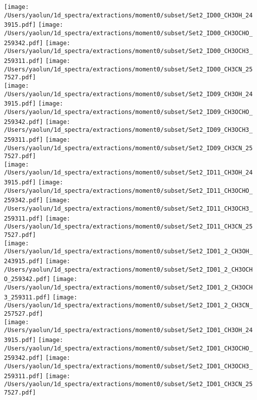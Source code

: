 \addtocounter{figure}{-1}
\begin{figure*}[htbp!]
  \centering
  \texttt{[image: /Users/yaolun/1d\_spectra/extractions/moment0/subset/Set2\_ID00\_CH3OH\_243915.pdf]}
  \texttt{[image: /Users/yaolun/1d\_spectra/extractions/moment0/subset/Set2\_ID00\_CH3OCHO\_259342.pdf]}
  \texttt{[image: /Users/yaolun/1d\_spectra/extractions/moment0/subset/Set2\_ID00\_CH3OCH3\_259311.pdf]}
  \texttt{[image: /Users/yaolun/1d\_spectra/extractions/moment0/subset/Set2\_ID00\_CH3CN\_257527.pdf]}
  \\
  \texttt{[image: /Users/yaolun/1d\_spectra/extractions/moment0/subset/Set2\_ID09\_CH3OH\_243915.pdf]}
  \texttt{[image: /Users/yaolun/1d\_spectra/extractions/moment0/subset/Set2\_ID09\_CH3OCHO\_259342.pdf]}
  \texttt{[image: /Users/yaolun/1d\_spectra/extractions/moment0/subset/Set2\_ID09\_CH3OCH3\_259311.pdf]}
  \texttt{[image: /Users/yaolun/1d\_spectra/extractions/moment0/subset/Set2\_ID09\_CH3CN\_257527.pdf]}
  \\
  \texttt{[image: /Users/yaolun/1d\_spectra/extractions/moment0/subset/Set2\_ID11\_CH3OH\_243915.pdf]}
  \texttt{[image: /Users/yaolun/1d\_spectra/extractions/moment0/subset/Set2\_ID11\_CH3OCHO\_259342.pdf]}
  \texttt{[image: /Users/yaolun/1d\_spectra/extractions/moment0/subset/Set2\_ID11\_CH3OCH3\_259311.pdf]}
  \texttt{[image: /Users/yaolun/1d\_spectra/extractions/moment0/subset/Set2\_ID11\_CH3CN\_257527.pdf]}
  \\
  \texttt{[image: /Users/yaolun/1d\_spectra/extractions/moment0/subset/Set2\_ID01\_2\_CH3OH\_243915.pdf]}
  \texttt{[image: /Users/yaolun/1d\_spectra/extractions/moment0/subset/Set2\_ID01\_2\_CH3OCHO\_259342.pdf]}
  \texttt{[image: /Users/yaolun/1d\_spectra/extractions/moment0/subset/Set2\_ID01\_2\_CH3OCH3\_259311.pdf]}
  \texttt{[image: /Users/yaolun/1d\_spectra/extractions/moment0/subset/Set2\_ID01\_2\_CH3CN\_257527.pdf]}
  \\
  \texttt{[image: /Users/yaolun/1d\_spectra/extractions/moment0/subset/Set2\_ID01\_CH3OH\_243915.pdf]}
  \texttt{[image: /Users/yaolun/1d\_spectra/extractions/moment0/subset/Set2\_ID01\_CH3OCHO\_259342.pdf]}
  \texttt{[image: /Users/yaolun/1d\_spectra/extractions/moment0/subset/Set2\_ID01\_CH3OCH3\_259311.pdf]}
  \texttt{[image: /Users/yaolun/1d\_spectra/extractions/moment0/subset/Set2\_ID01\_CH3CN\_257527.pdf]}
  \\
  \caption{}
\end{figure*}
